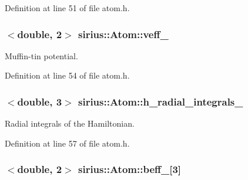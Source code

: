 Definition at line 51 of file atom.\+h.

\hypertarget{classsirius_1_1_atom_a48d48cd4a91c5a2ce036991ae4887cd8}{}
\subsubsection[{veff\+\_\+}]{$<$double, 2$>$ sirius\+::\+Atom\+::veff\+\_\+\hspace{0.3cm}{\ttfamily [private]}}\label{classsirius_1_1_atom_a48d48cd4a91c5a2ce036991ae4887cd8}


Muffin-\/tin potential. 



Definition at line 54 of file atom.\+h.

\hypertarget{classsirius_1_1_atom_a797cadfe559229ff7d2f62ec7fa87c11}{}
\subsubsection[{h\+\_\+radial\+\_\+integrals\+\_\+}]{$<$double, 3$>$ sirius\+::\+Atom\+::h\+\_\+radial\+\_\+integrals\+\_\+\hspace{0.3cm}{\ttfamily [private]}}\label{classsirius_1_1_atom_a797cadfe559229ff7d2f62ec7fa87c11}


Radial integrals of the Hamiltonian. 



Definition at line 57 of file atom.\+h.

\hypertarget{classsirius_1_1_atom_a77acbab247233e4eab5bebc1bb4f3d98}{}
\subsubsection[{beff\+\_\+}]{$<$double, 2$>$ sirius\+::\+Atom\+::beff\+\_\+\mbox{[}3\mbox{]}\hspace{0.3cm}{\ttfamily [private]}}\label{classsirius_1_1_atom_a77acbab247233e4eab5bebc1bb4f3d98}


